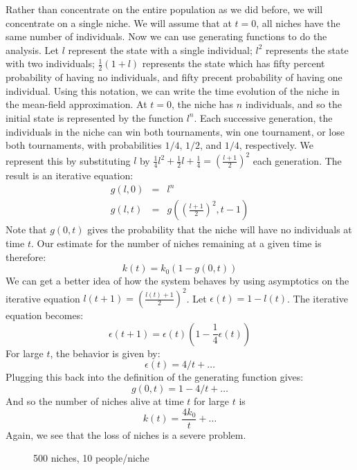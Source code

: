 Rather than concentrate on the entire population as we did before, we
will concentrate on a single niche.  We will assume that at $t=0$,
all niches have the same number of individuals.  Now 
we can use generating functions to do the analysis.
Let $l$ represent the state with a single individual; $l^2$ represents
the state with two individuals; $\frac{1}{2}(1+l)$ represents the
state which has fifty percent probability of having no individuals, and
fifty precent probability of having one individual.  Using this notation,
we can write the time evolution of the niche in the mean-field approximation.
At $t=0$, the niche has $n$ individuals, and so the initial state is
represented by the function $l^n$.  Each successive generation, the
individuals in the niche can win both tournaments, win one tournament,
or lose both tournaments, with probabilities $1/4$, $1/2$, and $1/4$,
respectively.  We represent this by substituting $l$ by 
$\frac{1}{4}l^2+\frac{1}{2}l+\frac{1}{4}=(\frac{l+1}{2})^2$ each generation.
The result is an iterative equation:
\begin{eqnarray}
g(l,0)&=&l^n \\
g(l,t)&=&g((\frac{l+1}{2})^2,t-1)
\end{eqnarray}
Note that $g(0,t)$ gives the probability that the niche will have no
individuals at time $t$.  Our estimate for the number of niches remaining
at a given time is therefore:
\begin{equation}
k(t)=k_0 (1-g(0,t))
\end{equation}
We can get a better idea of how the system behaves by using asymptotics
on the iterative equation $l(t+1)= (\frac{l(t)+1}{2})^2$.
Let $\epsilon(t)=1-l(t)$.  The iterative equation becomes:
\begin{equation}
\epsilon(t+1)=\epsilon(t)(1-\frac{1}{4}\epsilon(t))
\end{equation}
For large $t$, the behavior is given by:
\begin{equation}
\epsilon(t)=4/t+\ldots
\end{equation}
Plugging this back into the definition of the generating function gives:
\begin{equation}
g(0,t)=1-4/t+\ldots
\end{equation}
And so the number of niches alive at time $t$ for large $t$ is
\begin{equation}
k(t)=\frac{4 k_0}{t}+\ldots
\end{equation}
Again, we see that the loss of niches is a severe problem.
\begin{figure}
\caption{500 niches, 10 people/niche}
\end{figure}

